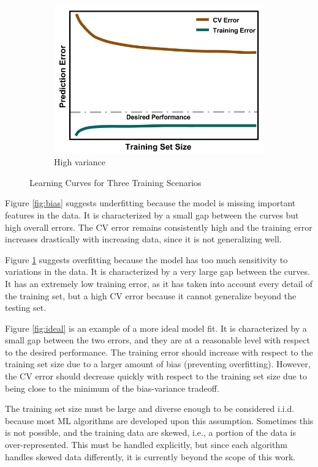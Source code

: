 \begin{figure}[!hp]
\begin{subfigure}[h]{0.65\linewidth}
    \includegraphics[width=\linewidth]{./chapters/litrev/LearningCurve-variance.png}
    \caption{High variance}
    \label{fig:variance}
  \end{subfigure}
  \caption{Learning Curves for Three Training Scenarios}
  \label{fig:learning}
\end{figure}

Figure \ref{fig:bias} suggests underfitting because the model is missing
important features in the data. It is characterized by a small gap between the
curves but high overall errors. The \gls{CV} error remains consistently
high and the training error increases drastically with increasing data, since
it is not generalizing well. 

Figure \ref{fig:variance} suggests overfitting because the model has too much
sensitivity to variations in the data. It is characterized by a very large gap
between the curves. It has an extremely low training error, as it has taken
into account every detail of the training set, but a high \gls{CV}
error because it cannot generalize beyond the testing set. 

Figure \ref{fig:ideal} is an example of a more ideal model fit. It is
characterized by a small gap between the two errors, and they are at a
reasonable level with respect to the desired performance.  The training error
should increase with respect to the training set size due to a larger amount of
bias (preventing overfitting). However, the \gls{CV} error should decrease
quickly with respect to the training set size due to being close to the minimum
of the bias-variance tradeoff. 

The training set size must be large and diverse enough to be considered
\gls{i.i.d.} because most \gls{ML} algorithms are developed upon this
assumption. Sometimes this is not possible, and the training data are skewed,
i.e., a portion of the data is over-represented. This must be handled
explicitly, but since each algorithm handles skewed data differently, it is
currently beyond the scope of this work. 

